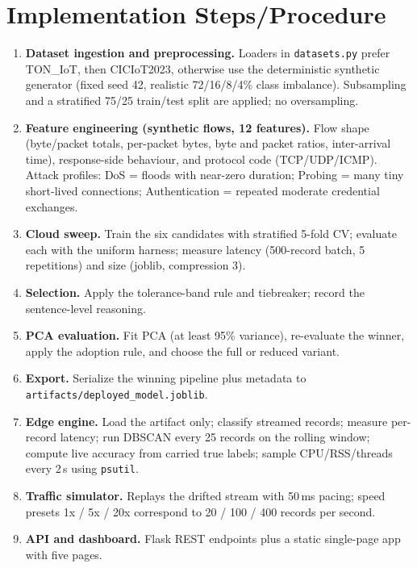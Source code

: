 \documentclass[12pt,a4paper]{article}
\begin{document}
\section{Implementation Steps/Procedure}

\begin{enumerate}
  \item \textbf{Dataset ingestion and preprocessing.} Loaders in \texttt{datasets.py}
        prefer TON\_IoT, then CICIoT2023, otherwise use the deterministic synthetic
        generator (fixed seed 42, realistic 72/16/8/4\% class imbalance). Subsampling
        and a stratified 75/25 train/test split are applied; no oversampling.
  \item \textbf{Feature engineering (synthetic flows, 12 features).} Flow shape
        (byte/packet totals, per-packet bytes, byte and packet ratios, inter-arrival
        time), response-side behaviour, and protocol code (TCP/UDP/ICMP). Attack
        profiles: DoS = floods with near-zero duration; Probing = many tiny
        short-lived connections; Authentication = repeated moderate credential
        exchanges.
  \item \textbf{Cloud sweep.} Train the six candidates with stratified 5-fold CV;
        evaluate each with the uniform harness; measure latency (500-record batch, 5
        repetitions) and size (joblib, compression 3).
  \item \textbf{Selection.} Apply the tolerance-band rule and tiebreaker; record the
        sentence-level reasoning.
  \item \textbf{PCA evaluation.} Fit PCA (at least 95\% variance), re-evaluate the
        winner, apply the adoption rule, and choose the full or reduced variant.
  \item \textbf{Export.} Serialize the winning pipeline plus metadata to
        \texttt{artifacts/deployed\_model.joblib}.
  \item \textbf{Edge engine.} Load the artifact only; classify streamed records;
        measure per-record latency; run DBSCAN every 25 records on the rolling
        window; compute live accuracy from carried true labels; sample CPU/RSS/threads
        every 2\,s using \texttt{psutil}.
  \item \textbf{Traffic simulator.} Replays the drifted stream with 50\,ms pacing;
        speed presets 1x / 5x / 20x correspond to 20 / 100 / 400 records per second.
  \item \textbf{API and dashboard.} Flask REST endpoints plus a static single-page
        app with five pages.
\end{enumerate}
\end{document}
